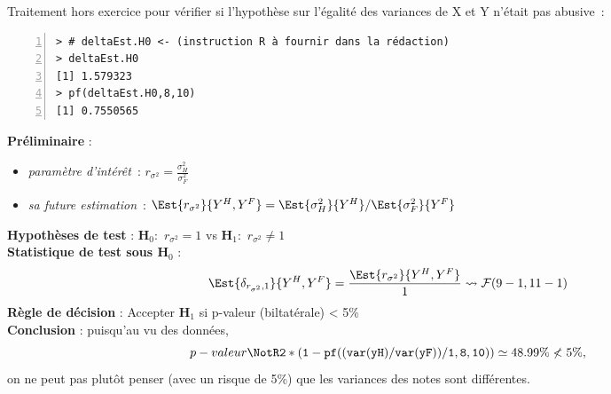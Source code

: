 \documentclass[10pt]{report}
\begin{document}
\begin{exercice}
Traitement hors exercice pour v{\'e}rifier si l'hypoth{\`e}se sur l'{\'e}galit{\'e} des variances de X et Y n'{\'e}tait pas abusive~:

\IndicR
\begin{Verbatim}[frame=leftline,fontfamily=tt,fontshape=n,numbers=left]
> # deltaEst.H0 <- (instruction R à fournir dans la rédaction)
> deltaEst.H0
[1] 1.579323
> pf(deltaEst.H0,8,10)
[1] 0.7550565
\end{Verbatim}



\begin{Correction}
\noindent \textbf{Préliminaire} : \begin{itemize}
\item \textit{paramètre d'intérêt}~: $r_{\sigma^2}=\displaystyle \frac{\sigma^2_{H}}{\sigma^2_{F}}$
\item \textit{sa future estimation}~: $\Est{r_{\sigma^2}}{Y^{H},Y^{F}}=\Est{\sigma^2_{H}}{Y^{H}}/\Est{\sigma^2_{F}}{Y^{F}}$
\end{itemize}
\noindent \textbf{Hypothèses de test} : $\mathbf{H}_0:$ $r_{\sigma^2}=1$ vs {\large $\mathbf{H}_1:$ $r_{\sigma^2}\neq1$}\\
\textbf{Statistique de test sous $\mathbf{H}_0$} :
  $$
  \Est{\delta_{r_{\sigma^2},1}}{Y^{H},Y^{F}}= {\displaystyle \frac{\Est{r_{\sigma^2}}{Y^{H},Y^{F}}}{1}} 
  \leadsto \mathcal{F}(9-1,11-1) 
  $$
\textbf{Règle de décision} : Accepter $\mathbf{H}_1$ si 
  p-valeur (biltatérale) < 5\%\\
\noindent \textbf{Conclusion} :
puisqu'au vu des données, 
  \[
p-valeur\NotR\mathtt{2*(1-pf((var(yH)/var(yF))/1,8,10))} \simeq 48.99\%\nless5\%,
\]
on ne peut pas plutôt penser (avec un risque de 5\%) que les variances des notes sont différentes.
\end{Correction}


\end{exercice}
\end{document}
